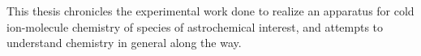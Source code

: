 This thesis chronicles the experimental work done to realize an apparatus for cold ion-molecule chemistry of species of astrochemical interest, and attempts to understand chemistry in general along the way.